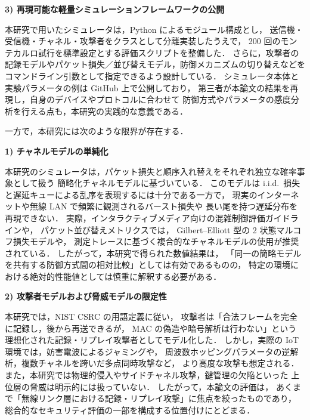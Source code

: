 \documentclass[twocolumn,10pt,a4paper]{jsarticle}
\begin{document}
\vspace{0.5em}
\noindent\textbf{3) 再現可能な軽量シミュレーションフレームワークの公開}\par
本研究で用いたシミュレータは，Python によるモジュール構成とし，
送信機・受信機・チャネル・攻撃者をクラスとして分離実装したうえで，
200 回のモンテカルロ試行を標準設定とする評価スクリプトを整備した\cite{ReplaySimReadmeJP}．
さらに，攻撃者の記録モデルやパケット損失／並び替えモデル，防御メカニズムの切り替えなどを
コマンドライン引数として指定できるよう設計している．
シミュレータ本体と実験パラメータの例は GitHub 上で公開しており\cite{ReplaySimReadmeJP}，
第三者が本論文の結果を再現し，自身のデバイスやプロトコルに合わせて
防御方式やパラメータの感度分析を行える点も，本研究の実践的な意義である．

\vspace{1em}
一方で，本研究には次のような限界が存在する．

\vspace{0.5em}
\noindent\textbf{1) チャネルモデルの単純化}\par
本研究のシミュレータは，パケット損失と順序入れ替えをそれぞれ独立な確率事象として扱う
簡略化チャネルモデルに基づいている．
このモデルは i.i.d.\ 損失と遅延キューによる乱序を表現するには十分である一方で，
現実のインターネットや無線 LAN で頻繁に観測されるバースト損失や
長い尾を持つ遅延分布を再現できない\cite{Jiang2000Modeling,Hasslinger2008GE}．
実際，インタラクティブメディア向けの混雑制御評価ガイドライン\cite{RFC8868,IETF-RMCAT-Eval}や，
パケット並び替えメトリクス\cite{rfc4737}では，
Gilbert--Elliott 型の 2 状態マルコフ損失モデルや，
測定トレースに基づく複合的なチャネルモデルの使用が推奨されている．
したがって，本研究で得られた数値結果は，
「同一の簡略モデルを共有する防御方式間の相対比較」としては有効であるものの，
特定の環境における絶対的性能値としては慎重に解釈する必要がある．

\vspace{0.5em}
\noindent\textbf{2) 攻撃者モデルおよび脅威モデルの限定性}\par
本研究では，NIST CSRC の用語定義\cite{NISTReplay}に従い，
攻撃者は「合法フレームを完全に記録し，後から再送できるが，
MAC の偽造や暗号解析は行わない」という
理想化された記録・リプレイ攻撃者としてモデル化した．
しかし，実際の IoT 環境では，妨害電波によるジャミングや，
周波数ホッピングパラメータの逆解析，複数チャネルを跨いだ多点同時攻撃など，
より高度な攻撃も想定される\cite{Anthi2024RFVuln,Lazzaro2024}．
また，本研究では物理的侵入やサイドチャネル攻撃，鍵管理の欠陥といった
上位層の脅威は明示的には扱っていない．
したがって，本論文の評価は，
あくまで「無線リンク層における記録・リプレイ攻撃」に焦点を絞ったものであり，
総合的なセキュリティ評価の一部を構成する位置付けにとどまる．
\end{document}
